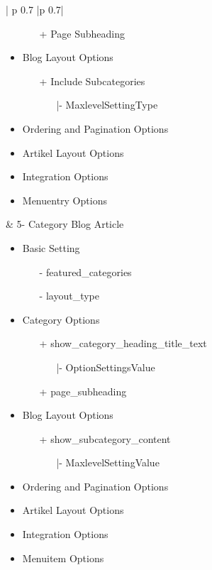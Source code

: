\begin{minipage}{0.8\textwidth}
\begin{longtable}{| p {0.7\textwidth} |p {0.7\textwidth}|}
\begin{itemize}
\begin{enumerate}
\begin{enumerate}
			\end{enumerate}
		\item[+] Page Subheading
	\end{enumerate}
\item Blog Layout Options
	\begin{enumerate}
		\item[+] Include Subcategories
			\begin{enumerate}
			\item[|-] MaxlevelSettingType
			\end{enumerate}
	\end{enumerate}
\item Ordering and Pagination Options
\item Artikel Layout Options
\item Integration Options
\item Menuentry Options  
\end{itemize}
&
5- Category Blog Article
\begin{itemize}
\item Basic Setting
	\begin{enumerate}
		\item[-] featured\_categories
		\item[-] layout\_type 
	 \end{enumerate}
\item Category Options
	\begin{enumerate}
		\item[+] show\_category\_heading\_title\_text
			\begin{enumerate}
			\item[|-] OptionSettingsValue
			\end{enumerate}
		\item[+] page\_subheading
	\end{enumerate}
\item Blog Layout Options
	\begin{enumerate}
		\item[+] show\_subcategory\_content
			\begin{enumerate}
			\item[|-] MaxlevelSettingValue
			\end{enumerate}
	\end{enumerate}
\item Ordering and Pagination Options
\item Artikel Layout Options
\item Integration Options
\item Menuitem Options 
\end{itemize}
\\ \hline
\end{longtable}
\end{minipage}

